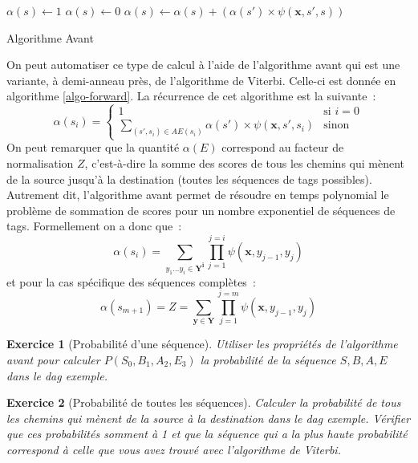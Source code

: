 \documentclass[11pt,openany]{book}
\newtheorem{exo}{Exercice}[chapter]
\newcommand{\ac}[1]{{\sc #1}} %
\begin{document}
\begin{algorithm}[htbp]
\begin{algorithmic}
\State {}
\State $\alpha(s) \gets 1$
\State $\alpha(s) \gets 0$
\State  $\alpha(s) \gets \alpha(s) + (\alpha(s')  \times \psi(\mathbf{x},s',s) ) $
\EndFor
\EndFor
\EndFunction
\end{algorithmic}
\caption{\label{algo-forward}Algorithme Avant}
\end{algorithm}

On peut automatiser ce type de calcul à l'aide de l'algorithme avant qui est une variante, à demi-anneau près, de l'algorithme de Viterbi. Celle-ci est donnée en algorithme \ref{algo-forward}. La récurrence de cet algorithme est la suivante~: 
\begin{equation}
\label{eq-forward}
\alpha(s_i) = \left\{ 
\begin{array}{ll}
1 & \text{si }  i = 0\\
\sum_{(s',s_i)\in AE(s_i)}  \alpha(s') \times \psi(\mathbf{x},s',s_i)&\text{sinon}
\end{array}
\right.
\end{equation}
On peut remarquer que la quantité $\alpha(E)$ correspond au facteur de normalisation $Z$, c'est-à-dire la somme des scores de tous les chemins qui mènent de la source jusqu'à la destination (toutes les séquences de tags possibles). Autrement dit, l'algorithme avant permet de résoudre en temps polynomial le problème de sommation de scores pour un nombre exponentiel de séquences de tags. Formellement on a donc que~: 
\begin{displaymath}
\alpha(s_i) = \sum_{y_1\ldots y_i \in \mathbf{Y^i}}\prod_{j=1}^{j=i} \psi(\mathbf{x},y_{j-1},y_j)
\end{displaymath}
et pour la cas spécifique des séquences complètes~: 
\begin{displaymath}
\alpha(s_{m+1}) = Z = \sum_{\mathbf{y}\in \mathbf{Y}}\prod_{j=1}^{j=m} \psi(\mathbf{x},y_{j-1},y_j)
\end{displaymath}


\begin{exo}[Probabilité d'une séquence]
Utiliser les propriétés de l'algorithme avant pour 
calculer $P(S_0,B_1,A_2,E_3)$ la probabilité de la séquence $S,B,A,E$ dans le \ac{dag} exemple.
\end{exo}

\begin{exo}[Probabilité de toutes les séquences]
Calculer la probabilité de tous les chemins qui mènent de la source à la destination dans le \ac{dag} exemple. Vérifier que ces probabilités somment à 1 et que la séquence qui a la plus haute probabilité correspond à celle que vous avez trouvé avec l'algorithme de Viterbi.
\end{exo}
\end{document}
